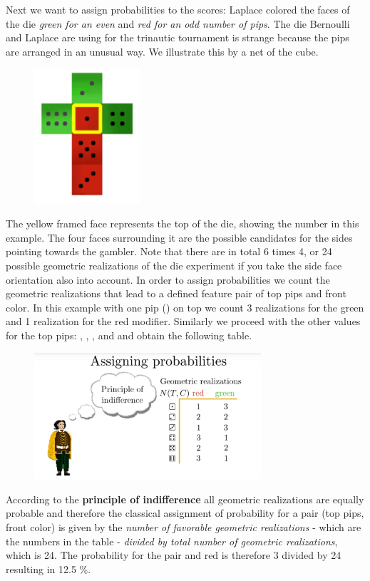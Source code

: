 \documentclass[12pt, a4paper]{scrartcl}
\begin{document}
Next we want to assign probabilities to the scores:
Laplace colored the faces of the die \textit{green for an even} and \textit{red for an odd number of pips}. 
The die Bernoulli and Laplace are using for the trinautic tournament is strange because the pips are arranged in an unusual way. We illustrate this by a net of the cube. 
\begin{figure}[H]
	\centering
	\includegraphics[width=0.35\textwidth]{3_3.png}
\end{figure}
The yellow framed face represents the top of the die, showing the number  in this example.
The four faces surrounding it are the possible candidates for the sides pointing towards the gambler. Note that there are in total 6 times 4, or 24 possible geometric realizations of the die experiment if you take the side face orientation also into account.
In order to assign probabilities we count the geometric realizations that lead to a defined feature pair of top pips and front color.
In this example with one pip () on top we count 3 realizations for the green and 1 realization for the red modifier.
Similarly we proceed with the other values for the top pips: , , ,  and  and obtain the following table. %
\begin{figure}[H]
	\centering
	\includegraphics[width=0.75\textwidth]{3_4.png}
\end{figure}
According to the \textbf{principle of indifference} all geometric realizations are equally probable and therefore the classical assignment of probability for a pair (top pips, front color) is given by the \textit{number of favorable geometric realizations} - which are the numbers in the table - \textit{divided by total number of geometric realizations}, which is 24. 
The probability for the pair  and red is therefore 3 divided by 24 resulting in 12.5 \%.  \\
\end{document}
